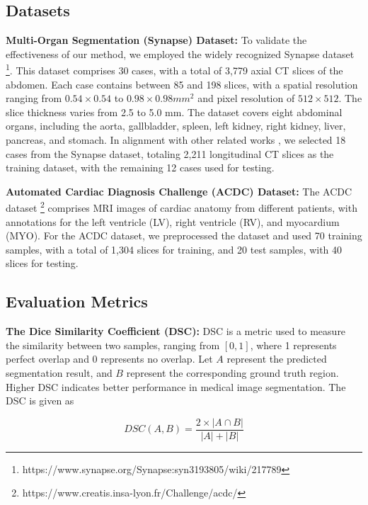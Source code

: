 \documentclass[sn-mathphys-num]{sn-jnl}
\theoremstyle{thmstyleone}%
\theoremstyle{thmstyletwo}%
\theoremstyle{thmstylethree}%
\begin{document}
\subsection{Datasets}\label{subsec5}

\textbf{Multi-Organ Segmentation (Synapse) Dataset:}
To validate the effectiveness of our method, we employed the widely recognized Synapse dataset \footnote{https://www.synapse.org/Synapse:syn3193805/wiki/217789}.
This dataset comprises 30 cases, with a total of 3,779 axial CT slices of the abdomen.
Each case contains between 85 and 198 slices, with a spatial resolution ranging from \(0.54\times 0.54\) to \(0.98\times 0.98 mm^2\) and pixel resolution of \(512\times 512\).
The slice thickness varies from 2.5 to 5.0 mm.
The dataset covers eight abdominal organs, including the aorta, gallbladder, spleen, left kidney, right kidney, liver, pancreas, and stomach.
In alignment with other related works \cite{cao2022swin,chen2021transunet}, we selected 18 cases from the Synapse dataset, totaling 2,211 longitudinal CT slices as the training dataset, with the remaining 12 cases used for testing.

\textbf{Automated Cardiac Diagnosis Challenge (ACDC) Dataset:}
The ACDC dataset \footnote{https://www.creatis.insa-lyon.fr/Challenge/acdc/} comprises MRI images of cardiac anatomy from different patients, with annotations for the left ventricle (LV), right ventricle (RV), and myocardium (MYO).
For the ACDC dataset, we preprocessed the dataset and used 70 training samples, with a total of 1,304 slices for training, and 20 test samples, with 40 slices for testing\cite{cao2022swin,chen2021transunet}.

\subsection{Evaluation Metrics}

\textbf{The Dice Similarity Coefficient (DSC):}
DSC is a metric used to measure the similarity between two samples, ranging from \(\left[0,1\right]\), where 1 represents perfect overlap and 0 represents no overlap\cite{sudre2017generalised,cao2022swin}.
Let \(A\) represent the predicted segmentation result, and \(B\) represent the corresponding ground truth region.
Higher DSC indicates better performance in medical image segmentation.
The DSC is given as

\begin{equation}
    DSC\left(A,B\right) = \frac{2\times\left|A\cap B\right|}{\left|A\right|+\left|B\right|}\label{eq11}
\end{equation}
\end{document}
